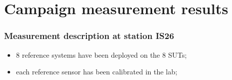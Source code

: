 \documentclass[handout,10pt]{beamer}
\begin{document}
\section{Campaign measurement results}
\begin{frame}
\frametitle{Measurement description at station IS26}
\begin{itemize}
\item
8 reference systems have been deployed on the 8 SUTs;
\item
each reference sensor has been calibrated in the lab; 
\end{itemize}
\end{frame}

\end{document}
